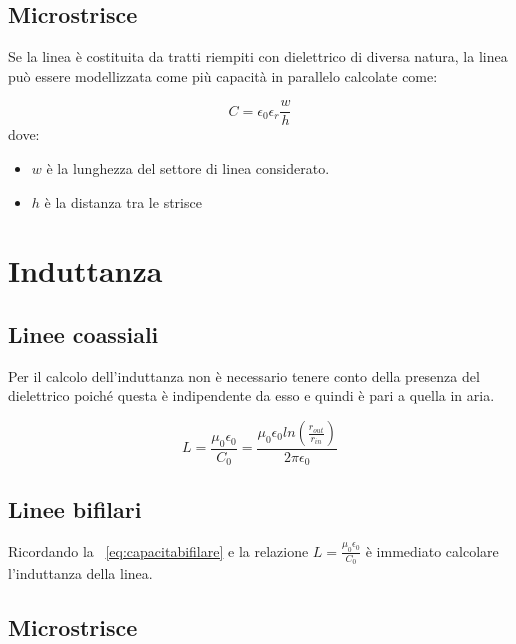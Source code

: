 \documentclass[10pt,a4paper]{report}
\begin{document}
		\subsection{Microstrisce}

	

	 		Se la linea è costituita da tratti riempiti con dielettrico di diversa natura, la linea può essere modellizzata come più capacità in parallelo calcolate come:

	 		\begin{equation}
			C=\epsilon_0 \epsilon_r\frac{w}{h}	 			
	 		\end{equation} 
	 		dove:
	 		\begin{itemize}
	 		\item $w$ è la lunghezza del settore di linea considerato.
	 		\item $h$ è la distanza tra le strisce
	 		\end{itemize}


	\section{Induttanza}

		\subsection{Linee coassiali}

			Per il calcolo dell’induttanza non è necessario tenere conto della presenza del dielettrico
			poiché questa è indipendente da esso e quindi è pari a quella in aria.
		
			\begin{equation}
				L=\frac{\mu_0 \epsilon_0}{C_0}=\frac{\mu_0 \epsilon_0 ln (\frac { r_{out}} {r_{in} } )}{2\pi \epsilon_0}
			\end{equation}



		\subsection{Linee bifilari}

		Ricordando la ~\ref{eq:capacitabifilare} e la relazione $L=\frac{\mu_0 \epsilon_0}{C_0}$ è immediato calcolare l'induttanza della linea.

		\subsection{Microstrisce}
			
\end{document}
